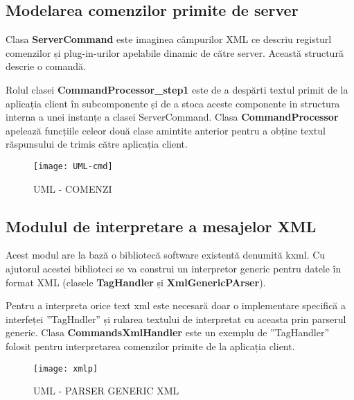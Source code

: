 \subsection{Modelarea comenzilor primite de server}
\par Clasa \textbf{ServerCommand} este imaginea câmpurilor XML ce descriu registurl comenzilor și plug-in-urilor apelabile dinamic de către server. Această structură descrie o comandă.
\par Rolul clasei \textbf{CommandProcessor\_step1} este de a despărti textul primit de la aplicația client în subcomponente și de a stoca aceste componente in structura interna a unei instanțe a clasei ServerCommand. Clasa \textbf{CommandProcessor} apelează funcțiile celeor două clase amintite anterior pentru a obține textul răspunsului de trimis către aplicația client.

\begin{figure}[h]
    \centering
    \texttt{[image: UML-cmd]}
    \caption{UML - COMENZI}
    \label{fig:imag7}
\end{figure}

\subsection{Modulul de interpretare a mesajelor XML}
\par Acest modul are la bază o bibliotecă software existentă denumită kxml. Cu ajutorul acestei biblioteci se va construi un interpretor generic pentru datele în format XML (clasele \textbf{TagHandler} și \textbf{XmlGenericPArser}).
\par Pentru a interpreta orice text xml este necesară doar o implementare specifică a interfeței ”TagHndler” și rularea textului de interpretat cu aceasta prin parserul generic. Clasa \textbf{CommandsXmlHandler} este un exemplu de ”TagHandler” folosit pentru interpretarea comenzilor primite de la aplicația client.

\begin{figure}[h]
    \centering
    \texttt{[image: xmlp]}
    \caption{UML - PARSER GENERIC XML}
    \label{fig:imag7}
\end{figure}

